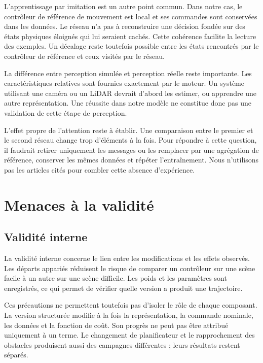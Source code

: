 L'apprentissage par imitation est un autre point commun. Dans notre cas, le contrôleur de référence de mouvement est local et ses commandes sont conservées dans les données. Le réseau n'a pas à reconstruire une décision fondée sur des états physiques éloignés qui lui seraient cachés. Cette cohérence facilite la lecture des exemples. Un décalage reste toutefois possible entre les états rencontrés par le contrôleur de référence et ceux visités par le réseau.

La différence entre perception simulée et perception réelle reste importante. Les caractéristiques relatives sont fournies exactement par le moteur. Un système utilisant une caméra ou un LiDAR devrait d'abord les estimer, ou apprendre une autre représentation. Une réussite dans notre modèle ne constitue donc pas une validation de cette étape de perception.

L'effet propre de l'attention reste à établir. Une comparaison entre le premier et le second réseau change trop d'éléments à la fois. Pour répondre à cette question, il faudrait retirer uniquement les messages ou les remplacer par une agrégation de référence, conserver les mêmes données et répéter l'entraînement. Nous n'utilisons pas les articles cités pour combler cette absence d'expérience.

\section*{Menaces à la validité}
{}
\subsection*{Validité interne}
{}
La validité interne concerne le lien entre les modifications et les effets observés. Les départs appariés réduisent le risque de comparer un contrôleur sur une scène facile à un autre sur une scène difficile. Les poids et les paramètres sont enregistrés, ce qui permet de vérifier quelle version a produit une trajectoire.

Ces précautions ne permettent toutefois pas d'isoler le rôle de chaque composant. La version structurée modifie à la fois la représentation, la commande nominale, les données et la fonction de coût. Son progrès ne peut pas être attribué uniquement à un terme. Le changement de planificateur et le rapprochement des obstacles produisent aussi des campagnes différentes ; leurs résultats restent séparés.

